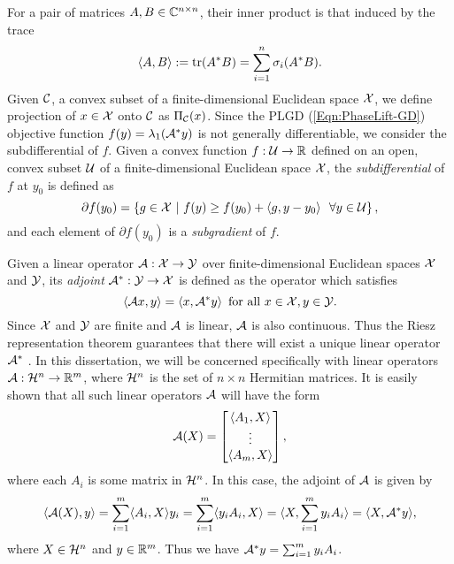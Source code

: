 For a pair of matrices $A, B \in {\mathbb C}^{n \times n}$, their inner product is that induced by the trace
\begin{equation}			\label{Def:trace_inner_product}
\langle A, B \rangle := \mathrm{tr}(A^*B) = \sum_{i=1}^n \sigma_i(A^*B).
\end{equation}
Given ${\mathcal C}$, a convex subset of a finite-dimensional Euclidean space ${\mathcal X}$, we define projection of $x \in {\mathcal X}$ onto ${\mathcal C}$ as $\Pi_{\mathcal C}(x)$.  Since the PLGD (\ref{Eqn:PhaseLift-GD}) objective function $f(y) = \lambda_1({\mathcal A}^*y)$ is not generally differentiable, we consider the subdifferential of $f$.  Given a convex function $f : {\mathcal U} \rightarrow {\mathbb R}$ defined on an open, convex subset ${\mathcal U}$ of a finite-dimensional Euclidean space ${\mathcal X}$, the \textit{subdifferential} of $f$ at $y_0$ is defined as
\begin{equation}
	\label{Def:subdifferential}
	\partial f(y_0) = \left\{  g \in {\mathcal X} \ | \ f(y) \geq f(y_0) + \langle g, y - y_0 \rangle \ \ \forall y \in {\mathcal U}	\right\},
\end{equation}
and each element of $\partial f(y_0)$ is a \textit{subgradient} of $f$.

Given a linear operator ${\mathcal A} : {\mathcal X} \rightarrow {\mathcal Y}$ over finite-dimensional Euclidean spaces ${\mathcal X}$ and ${\mathcal Y}$, its \textit{adjoint} ${\mathcal A}^* : {\mathcal Y} \rightarrow {\mathcal X}$ is defined as the operator which satisfies 
\begin{equation}			\label{Def:adjoint_operator}
\langle {\mathcal A} x, y \rangle = \langle x, {\mathcal A}^* y \rangle \hspace{5pt} \text{for all } x \in {\mathcal X}, y \in {\mathcal Y}. 
\end{equation} 
Since ${\mathcal X}$ and ${\mathcal Y}$ are finite and ${\mathcal A}$ is linear, ${\mathcal A}$ is also continuous.  Thus the Riesz representation theorem guarantees that there will exist a unique linear operator ${\mathcal A}^*$ \cite[Section 6.2]{reed1980functional}.  In this dissertation, we will be concerned specifically with linear operators ${\mathcal A}: {\mathcal H}^n \rightarrow {\mathbb R}^m$, where ${\mathcal H}^n$ is the set of $n \times n$ Hermitian matrices.  It is easily shown that all such linear operators ${\mathcal A}$ will have the form
\begin{equation}
{\mathcal A}(X) = \begin{bmatrix}
\langle A_1, X \rangle	\\
\vdots	\\
\langle A_m, X \rangle
\end{bmatrix},
\end{equation}
where each $A_i$ is some matrix in ${\mathcal H}^n$.  In this case, the adjoint of ${\mathcal A}$ is given by 
\begin{equation}
\langle {\mathcal A}(X), y \rangle  	= \sum_{i=1}^m \langle A_i, X \rangle y_i	  = \sum_{i=1}^m \langle y_iA_i, X \rangle   = \langle X, \sum_{i=1}^m  y_iA_i \rangle = \langle X, {\mathcal A}^*y \rangle,
\end{equation}
where $X \in {\mathcal H}^n$ and $y \in {\mathbb R}^m$.
Thus we have ${\mathcal A}^*y = \sum_{i=1}^m  y_iA_i$.


